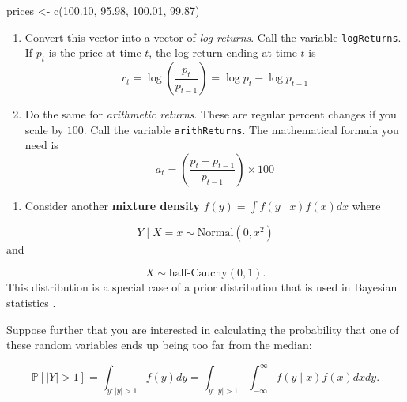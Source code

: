 \documentclass[
  12pt,
  krantz2]{krantz}
\makeatletter
\newenvironment{Shaded}{\begin{snugshade}}{\end{snugshade}}
\newcommand{\FloatTok}[1]{\textcolor[rgb]{0.06,0.06,0.06}{#1}}
\newcommand{\FunctionTok}[1]{\textcolor[rgb]{0,0,0}{#1}}
\newcommand{\NormalTok}[1]{#1}
\newcommand{\OtherTok}[1]{\textcolor[rgb]{0.37,0.37,0.37}{#1}}
\providecommand{\tightlist}{%
  \setlength{\itemsep}{0pt}\setlength{\parskip}{0pt}}
\newenvironment{kframe}{%
\medskip{}
\setlength{\fboxsep}{.8em}
 \def\at@end@of@kframe{}%
 \ifinner\ifhmode%
  \def\at@end@of@kframe{\end{minipage}}%
  \begin{minipage}{\columnwidth}%
 \fi\fi%
 \def\FrameCommand##1{\hskip\@totalleftmargin \hskip-\fboxsep
 \colorbox{shadecolor}{##1}\hskip-\fboxsep
     \hskip-\linewidth \hskip-\@totalleftmargin \hskip\columnwidth}%
 \MakeFramed {\advance\hsize-\width
   \@totalleftmargin\z@ \linewidth\hsize
   \@setminipage}}%
 {\par\unskip\endMakeFramed%
 \at@end@of@kframe}
\renewenvironment{Shaded}{\begin{kframe}}{\end{kframe}}
\makeatother
\begin{document}
\begin{Shaded}
\begin{Highlighting}[]
\NormalTok{prices }\OtherTok{\textless{}{-}} \FunctionTok{c}\NormalTok{(}\FloatTok{100.10}\NormalTok{, }\FloatTok{95.98}\NormalTok{, }\FloatTok{100.01}\NormalTok{, }\FloatTok{99.87}\NormalTok{)}
\end{Highlighting}
\end{Shaded}

\begin{enumerate}
\def\labelenumi{\alph{enumi}.}
\item
  Convert this vector into a vector of \emph{log returns}. Call the variable \texttt{logReturns}. If \(p_t\) is the price at time \(t\), the log return ending at time \(t\) is
  \begin{equation} 
  r_t = \log \left( \frac{p_t}{p_{t-1}} \right) = \log p_t - \log p_{t-1}
  \end{equation}
\item
  Do the same for \emph{arithmetic returns}. These are regular percent changes if you scale by \(100\). Call the variable \texttt{arithReturns}. The mathematical formula you need is
  \begin{equation} 
  a_t = \left( \frac{p_t - p_{t-1} }{p_{t-1}} \right) \times 100 
  \end{equation}
\end{enumerate}

\begin{enumerate}
\def\labelenumi{\arabic{enumi}.}
\setcounter{enumi}{2}
\tightlist
\item
  Consider another \textbf{mixture density} \(f(y) = \int f(y \mid x) f(x) dx\) where
\end{enumerate}

\begin{equation} 
Y \mid X = x \sim \text{Normal}(0, x^2)
\end{equation}
and

\begin{equation} 
X \sim \text{half-Cauchy}(0, 1).
\end{equation}
This distribution is a special case of a prior distribution that is used in Bayesian statistics \citep{horseshoe}.

Suppose further that you are interested in calculating the probability that one of these random variables ends up being too far from the median:

\begin{equation} 
\mathbb{P}[|Y| > 1] = \int_{y : |y| > 1} f(y)dy = \int_{y : |y| > 1} \int_{-\infty}^\infty  f(y \mid x) f(x) dx dy.
\end{equation}
\end{document}
